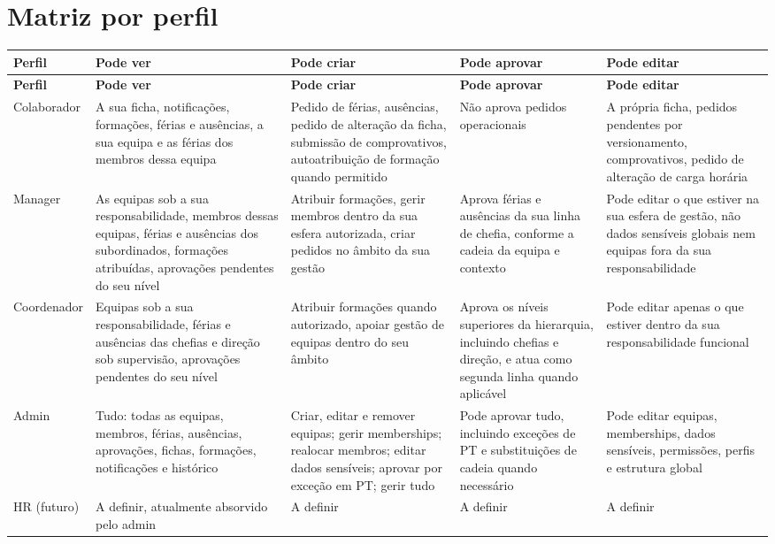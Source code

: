 \documentclass[11pt,a4paper]{article}
\begin{document}
\section{Matriz por perfil}

\begin{longtable}{p{2.4cm} p{4.4cm} p{3.2cm} p{3.0cm} p{3.2cm}}
\toprule
\textbf{Perfil} & \textbf{Pode ver} & \textbf{Pode criar} & \textbf{Pode aprovar} & \textbf{Pode editar} \\
\midrule
\endfirsthead
\toprule
\textbf{Perfil} & \textbf{Pode ver} & \textbf{Pode criar} & \textbf{Pode aprovar} & \textbf{Pode editar} \\
\midrule
\endhead

Colaborador & A sua ficha, notificações, formações, férias e ausências, a sua equipa e as férias dos membros dessa equipa & Pedido de férias, ausências, pedido de alteração da ficha, submissão de comprovativos, autoatribuição de formação quando permitido & Não aprova pedidos operacionais & A própria ficha, pedidos pendentes por versionamento, comprovativos, pedido de alteração de carga horária \\

Manager & As equipas sob a sua responsabilidade, membros dessas equipas, férias e ausências dos subordinados, formações atribuídas, aprovações pendentes do seu nível & Atribuir formações, gerir membros dentro da sua esfera autorizada, criar pedidos no âmbito da sua gestão & Aprova férias e ausências da sua linha de chefia, conforme a cadeia da equipa e contexto & Pode editar o que estiver na sua esfera de gestão, não dados sensíveis globais nem equipas fora da sua responsabilidade \\

Coordenador & Equipas sob a sua responsabilidade, férias e ausências das chefias e direção sob supervisão, aprovações pendentes do seu nível & Atribuir formações quando autorizado, apoiar gestão de equipas dentro do seu âmbito & Aprova os níveis superiores da hierarquia, incluindo chefias e direção, e atua como segunda linha quando aplicável & Pode editar apenas o que estiver dentro da sua responsabilidade funcional \\

Admin & Tudo: todas as equipas, membros, férias, ausências, aprovações, fichas, formações, notificações e histórico & Criar, editar e remover equipas; gerir memberships; realocar membros; editar dados sensíveis; aprovar por exceção em PT; gerir tudo & Pode aprovar tudo, incluindo exceções de PT e substituições de cadeia quando necessário & Pode editar equipas, memberships, dados sensíveis, permissões, perfis e estrutura global \\

HR (futuro) & A definir, atualmente absorvido pelo admin & A definir & A definir & A definir \\
\bottomrule
\end{longtable}
\end{document}
